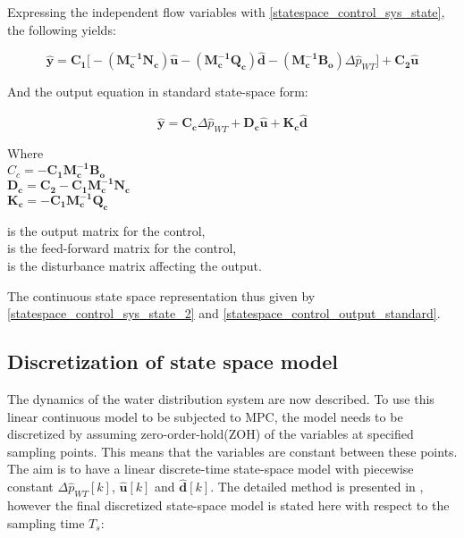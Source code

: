Expressing the independent flow variables with \eqref{statespace_control_sys_state}, the following yields: 

\begin{equation}
  \pmb{\hat{y}} = \pmb{C_1} \big[- (\pmb{M_c^{-1}}\pmb{N_c}) \pmb{\hat{u}} - (\pmb{M_c^{-1}}\pmb{Q_c}) \pmb{\hat{d}} - (\pmb{M_c^{-1}}\pmb{B_o}) \Delta \hat{p}_{WT}\big] + \pmb{C_2} \pmb{\hat{u}}  
   \label{statespace_control_output}
\end{equation}

And the output equation in standard state-space form:

\begin{equation}
  \pmb{\hat{y}} = \pmb{C_c} \Delta \hat{p}_{WT} + \pmb{D_c} \pmb{\hat{u}} + \pmb{K_c} \pmb{\hat{d}}
\label{statespace_control_output_standard}
\end{equation}

\begin{minipage}[t]{0.40\textwidth}
Where\\
\hspace*{8mm} $C_c = -\pmb{C_1}\pmb{M_c^{-1}}\pmb{B_o} $ \\
\hspace*{8mm} $\pmb{D_c} = \pmb{C_2} - \pmb{C_1}\pmb{M_c^{-1}}\pmb{N_c} $ \\
\hspace*{8mm} $\pmb{K_c} = -\pmb{C_1}\pmb{M_c^{-1}}\pmb{Q_c} $
\end{minipage}
\begin{minipage}[t]{0.48\textwidth}
\vspace*{1mm}
is the output matrix for the control, \\
is the feed-forward matrix for the control, \\
is the disturbance matrix affecting the output.
\end{minipage} 

The continuous state space representation thus given by \eqref{statespace_control_sys_state_2} and \eqref{statespace_control_output_standard}.

\subsection{Discretization of state space model}
 \label{discrete_SS}
 
The dynamics of the water distribution system are now described. To use this linear continuous model to be subjected to MPC, the model needs to be discretized by assuming zero-order-hold(ZOH) of the variables at specified sampling points. This means that the variables are constant between these points. The aim is to have a linear discrete-time state-space model with piecewise constant $\Delta \hat{p}_{WT}[k]$, $\pmb{\hat{u}}[k]$ and $\pmb{\hat{d}}[k]$. The detailed method is presented in , however the final discretized state-space model is stated here with respect to the sampling time $T_s$: 

